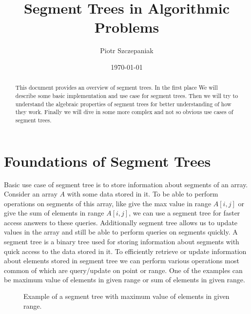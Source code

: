 \documentclass[11pt]{article}
\title{Segment Trees in Algorithmic Problems}
\author{Piotr Szczepaniak}
\date{\today}
\begin{document}
\maketitle

\tableofcontents

\begin{abstract}
This document provides an overview of segment trees. In the first place
We will describe some basic implementation and use case for segment trees.
Then we will try to understand the algebraic properties of segment trees for
better understanding of how they work. Finally we will dive in some more complex and not so obvious
use cases of segment trees.
\end{abstract}

\section{Foundations of Segment Trees}
Basic use case of segment tree is to store information about segments of an array.
Consider an array \(A\) with some data stored in it. To be able to perform operations on segments of this array, like
give the max value in range \(A[i, j]\) or give the sum of elements in range \(A[i, j]\), we can use a segment tree for faster
access answers to these queries. Additionally segment tree allows us to update values in the array and still be able to perform queries on segments quickly.
A segment tree is a binary tree used for storing information about segments with quick access to the data stored in it. 
To efficiently retrieve or update information about elements stored 
in segment tree we can perform various operations most common of which are
query/update on point or range.
One of the examples can be maximum value of 
elements in given range or sum of elements in given range.

\begin{figure}[H]
    \centering
    
    \caption{Example of a segment tree with maximum value of elements in given range.}
    \label{fig:segment_tree_1}
\end{figure}
\end{document}
